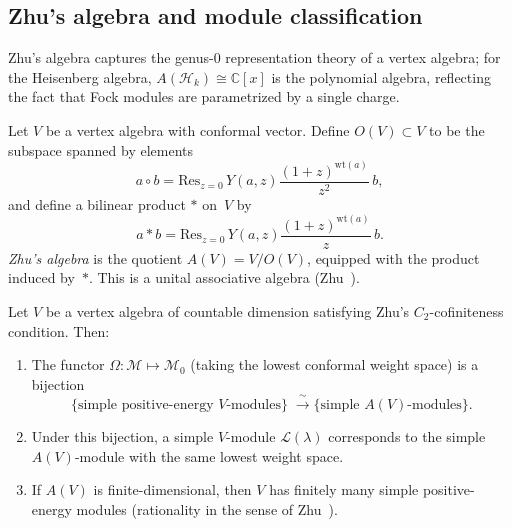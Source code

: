 \subsection{Zhu's algebra and module classification}

\begin{definition}\label{def:zhu-algebra}
Zhu's algebra captures the genus-$0$ representation theory of a vertex algebra; for the Heisenberg algebra, $A(\mathcal{H}_k) \cong \mathbb{C}[x]$ is the polynomial algebra, reflecting the fact that Fock modules are parametrized by a single charge.

Let $V$ be a vertex algebra with conformal vector.
Define $O(V) \subset V$ to be the subspace spanned by elements
\[
a \circ b = \mathrm{Res}_{z=0}\, Y(a,z) \frac{(1+z)^{\mathrm{wt}(a)}}{z^2}\, b,
\]
and define a bilinear product $*$ on~$V$ by
\[
a * b = \mathrm{Res}_{z=0}\, Y(a,z) \frac{(1+z)^{\mathrm{wt}(a)}}{z}\, b.
\]
\emph{Zhu's algebra} is the quotient
$A(V) = V / O(V)$,
equipped with the product induced by~$*$. This is a
unital associative algebra (Zhu~\cite{Zhu96}).
\end{definition}

\begin{theorem}
\label{thm:zhu-correspondence}
Let $V$ be a vertex algebra of countable dimension satisfying Zhu's
$C_2$-cofiniteness condition. Then:
\begin{enumerate}[label=(\roman*)]
\item The functor $\Omega\colon \mathcal{M} \mapsto \mathcal{M}_0$
 (taking the lowest conformal weight space) is a bijection
 \[
 \{\text{simple positive-energy } V\text{-modules}\}
 \;\xrightarrow{\;\sim\;}
 \{\text{simple } A(V)\text{-modules}\}.
 \]
\item Under this bijection, a simple $V$-module $\mathcal{L}(\lambda)$
 corresponds to the simple $A(V)$-module with the same lowest
 weight space.
\item If $A(V)$ is finite-dimensional, then $V$ has finitely many
 simple positive-energy modules (rationality in the sense
 of Zhu~\cite{Zhu96}).
\end{enumerate}
\end{theorem}

